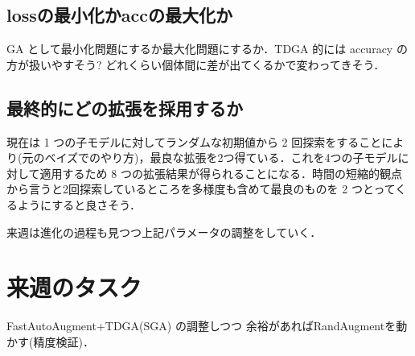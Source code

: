 \documentclass[onecolumn]{ujarticle}   %
\begin{document}
  \subsection{lossの最小化かaccの最大化か}
  GA として最小化問題にするか最大化問題にするか．TDGA 的には accuracy の方が扱いやすそう? どれくらい個体間に差が出てくるかで変わってきそう．

  \subsection{最終的にどの拡張を採用するか}
  現在は 1 つの子モデルに対してランダムな初期値から 2 回探索をすることにより(元のベイズでのやり方)，最良な拡張を2つ得ている．これを4つの子モデルに対して適用するため 8 つの拡張結果が得られることになる．時間の短縮的観点から言うと2回探索しているところを多様度も含めて最良のものを 2 つとってくるようにすると良さそう．


  来週は進化の過程も見つつ上記パラメータの調整をしていく．

	\section{来週のタスク}
	FastAutoAugment+TDGA(SGA) の調整しつつ 余裕があればRandAugmentを動かす(精度検証)．

	
	
\end{document}
